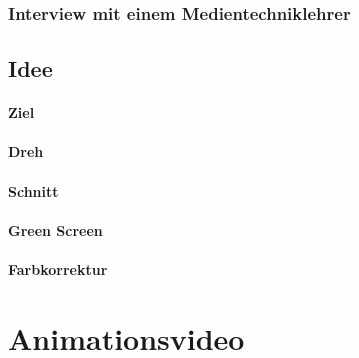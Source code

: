 \subsection{Interview mit einem Medientechniklehrer}
\section{Idee}
\renewcommand{\kapitelautor}{Autor: Niklas Kienreich}
\subsubsection{Ziel}
\renewcommand{\kapitelautor}{Autor: Niklas Kienreich}
\subsubsection{Dreh}
\renewcommand{\kapitelautor}{Autor: Niklas Kienreich}
\subsubsection{Schnitt}
\renewcommand{\kapitelautor}{Autor: Niklas Kienreich}
\subsubsection{Green Screen}
\renewcommand{\kapitelautor}{Autor: Niklas Kienreich}
\subsubsection{Farbkorrektur}
\renewcommand{\kapitelautor}{Autor: Niklas Kienreich}



\chapter{Animationsvideo}
\renewcommand{\kapitelautor}{Autor: Niklas Kienreich}
